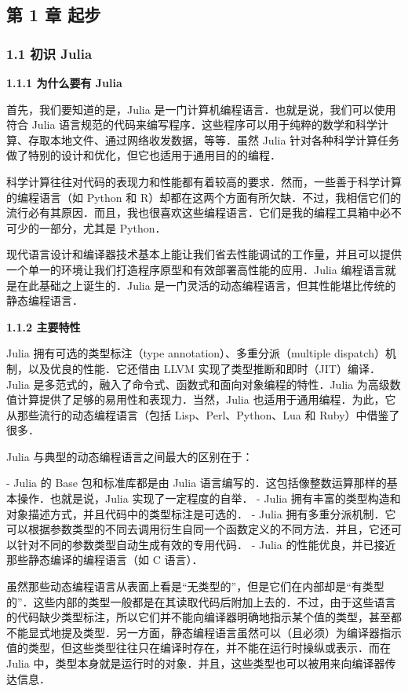 
\subsection{第 1 章 起步}

\subsubsection{1.1 初识 Julia}

\textbf{1.1.1 为什么要有 Julia}

首先，我们要知道的是，Julia 是一门计算机编程语言．也就是说，我们可以使用符合 Julia 语言规范的代码来编写程序．这些程序可以用于纯粹的数学和科学计算、存取本地文件、通过网络收发数据，等等．虽然 Julia 针对各种科学计算任务做了特别的设计和优化，但它也适用于通用目的的编程．

科学计算往往对代码的表现力和性能都有着较高的要求．然而，一些善于科学计算的编程语言（如 Python 和 R）却都在这两个方面有所欠缺．不过，我相信它们的流行必有其原因．而且，我也很喜欢这些编程语言．它们是我的编程工具箱中必不可少的一部分，尤其是 Python．

现代语言设计和编译器技术基本上能让我们省去性能调试的工作量，并且可以提供一个单一的环境让我们打造程序原型和有效部署高性能的应用．Julia 编程语言就是在此基础之上诞生的．Julia 是一门灵活的动态编程语言，但其性能堪比传统的静态编程语言．

\textbf{1.1.2 主要特性}

Julia 拥有可选的类型标注（type annotation）、多重分派（multiple dispatch）机制，以及优良的性能．它还借由 LLVM 实现了类型推断和即时（JIT）编译．Julia 是多范式的，融入了命令式、函数式和面向对象编程的特性．Julia 为高级数值计算提供了足够的易用性和表现力．当然，Julia 也适用于通用编程．为此，它从那些流行的动态编程语言（包括 Lisp、Perl、Python、Lua 和 Ruby）中借鉴了很多．

Julia 与典型的动态编程语言之间最大的区别在于：

- Julia 的 Base 包和标准库都是由 Julia 语言编写的．这包括像整数运算那样的基本操作．也就是说，Julia 实现了一定程度的自举．
- Julia 拥有丰富的类型构造和对象描述方式，并且代码中的类型标注是可选的．
- Julia 拥有多重分派机制．它可以根据参数类型的不同去调用衍生自同一个函数定义的不同方法．并且，它还可以针对不同的参数类型自动生成有效的专用代码．
- Julia 的性能优良，并已接近那些静态编译的编程语言（如 C 语言）．

虽然那些动态编程语言从表面上看是“无类型的”，但是它们在内部却是“有类型的”．这些内部的类型一般都是在其读取代码后附加上去的．不过，由于这些语言的代码缺少类型标注，所以它们并不能向编译器明确地指示某个值的类型，甚至都不能显式地提及类型．另一方面，静态编程语言虽然可以（且必须）为编译器指示值的类型，但这些类型往往只在编译时存在，并不能在运行时操纵或表示．而在 Julia 中，类型本身就是运行时的对象．并且，这些类型也可以被用来向编译器传达信息．

